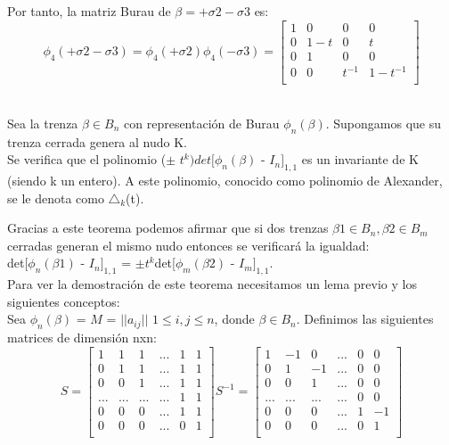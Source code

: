 \documentclass[14pt]{extarticle}
\begin{document}
 Por tanto, la matriz Burau de $\beta = +\sigma2-\sigma3$ es:
 \[ \phi_{4} (+\sigma2-\sigma3) = \phi_{4} (+\sigma2) \phi_{4}(-\sigma3) = \begin{bmatrix}
 1 & 0 & 0 & 0 \\
 0 & 1-t & 0 & t \\
 0 & 1 & 0 & 0  \\	
 0 & 0 & t^{-1} & 1-t^{-1} \\
 \end{bmatrix}\]\\
 
 
\begin{teo}\label{teoalex}
	Sea la trenza $\beta \in B_{n}$ con representación de Burau $\phi_{n}(\beta)$. Supongamos que su trenza cerrada genera al nudo K.\\
	Se verifica que el polinomio ($ \pm $ $ t^{k} )det[\phi_{n}(\beta)$ - $ I_{n} $$ ]_{1,1} $ es un invariante de K (siendo k un entero). A este polinomio, conocido como polinomio de Alexander, se le denota como $ \triangle_{k} $(t).
\end{teo}

Gracias a este teorema podemos afirmar que si dos trenzas $\beta1 \in B_{n}, \beta2 \in B_{m}$ cerradas generan el mismo nudo entonces se verificará la igualdad:\\
det[$\phi_{n}(\beta1)$ - $ I_{n} $$ ]_{1,1}$ = $ \pm t^{k} $det[$\phi_{m}(\beta2)$ - $ I_{m} $$ ]_{1,1}$.\\

Para ver la demostración de este teorema necesitamos un lema previo y los siguientes conceptos:\\

Sea $\phi_{n}(\beta)$ = $M$ = $||a_{ij}||$ $1 \le i,j \le n$, donde $\beta \in B_{n}$. Definimos las siguientes matrices de dimensión nxn:\\
  \[ S = \begin{bmatrix}
  1 & 1 & 1 &... & 1 & 1 \\
  0 & 1 & 1 &... & 1 & 1\\
  0 & 0 & 1 &... & 1 & 1 \\
  ... & ... & ...& ... & 1 & 1 \\	
  0 & 0 & 0 & ... & 1 & 1\\	
  0 & 0 & 0 & ... & 0 & 1\\
  \end{bmatrix} 
  S^{-1} = \begin{bmatrix}
  1 & -1 & 0 & ... & 0 & 0 \\
  0 & 1 & -1 & ... & 0 & 0\\
  0 & 0 & 1 & ... & 0  & 0\\
  ... & ... & ...& ... & 0 & 0  \\	
  0 & 0 & 0 &...& 1 & -1  \\	
  0 & 0 & 0 & ... & 0 & 1 \\
  \end{bmatrix}\]\\
  
\end{document}
